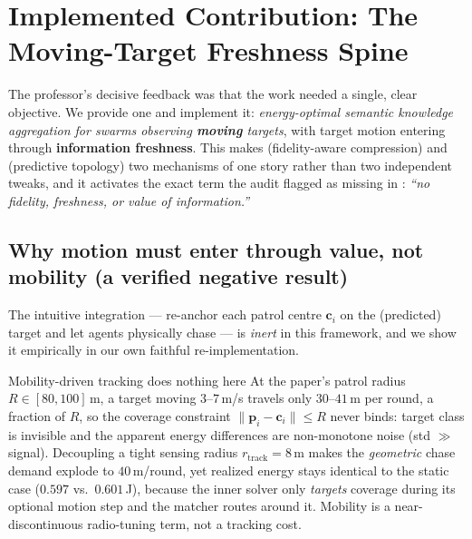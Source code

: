 
\section{Implemented Contribution: The Moving-Target Freshness Spine}
\label{sec:freshness}

The professor's decisive feedback was that the work needed a single, clear
objective. We provide one and implement it: \emph{energy-optimal semantic
knowledge aggregation for swarms observing \textbf{moving} targets}, with target
motion entering through \textbf{information freshness}. This makes
 (fidelity-aware compression) and  (predictive topology) two
mechanisms of one story rather than two independent tweaks, and it activates the
exact term the audit flagged as missing in : \emph{``no fidelity,
freshness, or value of information.''}

\subsection{Why motion must enter through value, not mobility (a verified negative result)}

The intuitive integration --- re-anchor each patrol centre $\mathbf c_i$ on the
(predicted) target and let agents physically chase --- is \emph{inert} in this
framework, and we show it empirically in our own faithful re-implementation.

\begin{limitbox}{Mobility-driven tracking does nothing here}
At the paper's patrol radius $R\in[80,100]$\,m, a target moving $3$--$7$\,m/s
travels only $30$--$41$\,m per round, a fraction of $R$, so the coverage
constraint $\lVert\mathbf p_i-\mathbf c_i\rVert\le R$ never binds: target class
is invisible and the apparent energy differences are non-monotone noise (std
$\gg$ signal). Decoupling a tight sensing radius $r_{\mathrm{track}}=8$\,m makes
the \emph{geometric} chase demand explode to $40$\,m/round, yet realized energy
stays identical to the static case ($0.597$ vs.\ $0.601$\,J), because the inner
solver only \emph{targets} coverage during its optional motion step and the
matcher routes around it. Mobility is a near-discontinuous radio-tuning term, not
a tracking cost.
\end{limitbox}

